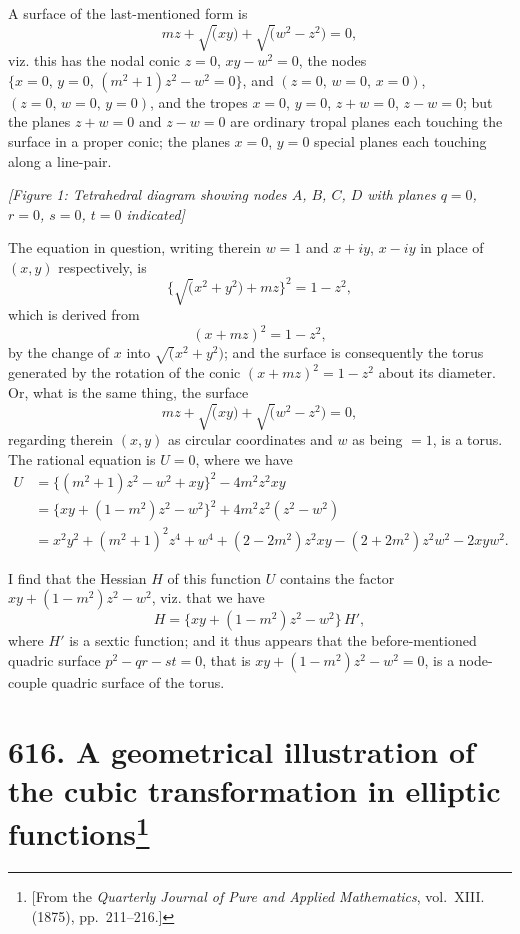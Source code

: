 \documentclass[11pt,a4paper]{book}
\begin{document}
A surface of the last-mentioned form is
\[
mz + \surd(xy) + \surd(w^2 - z^2) = 0,
\]
viz. this has the nodal conic $z = 0$, $xy - w^2 = 0$, the nodes $\{x = 0,\, y = 0,\, (m^2+1)z^2 - w^2 = 0\}$, and $(z = 0,\, w = 0,\, x = 0)$, $(z = 0,\, w = 0,\, y = 0)$, and the tropes $x = 0$, $y = 0$, $z+w = 0$, $z-w = 0$; but the planes $z+w = 0$ and $z-w = 0$ are ordinary tropal planes each touching the surface in a proper conic; the planes $x = 0$, $y = 0$ special planes each touching along a line-pair.

\begin{center}
\textit{[Figure 1: Tetrahedral diagram showing nodes $A$, $B$, $C$, $D$ with planes $q=0$, $r=0$, $s=0$, $t=0$ indicated]}
\end{center}

The equation in question, writing therein $w = 1$ and $x+iy$, $x-iy$ in place of $(x, y)$ respectively, is
\[
\{\surd(x^2+y^2) + mz\}^2 = 1 - z^2,
\]
which is derived from
\[
(x + mz)^2 = 1 - z^2,
\]
by the change of $x$ into $\surd(x^2+y^2)$; and the surface is consequently the torus generated by the rotation of the conic $(x+mz)^2 = 1-z^2$ about its diameter. Or, what is the same thing, the surface
\[
mz + \surd(xy) + \surd(w^2-z^2) = 0,
\]
regarding therein $(x, y)$ as circular coordinates and $w$ as being $= 1$, is a torus. The rational equation is $U = 0$, where we have
\begin{align*}
U &= \{(m^2+1)z^2 - w^2 + xy\}^2 - 4m^2z^2xy\\
&= \{xy + (1-m^2)z^2 - w^2\}^2 + 4m^2z^2(z^2-w^2)\\
&= x^2y^2 + (m^2+1)^2z^4 + w^4 + (2-2m^2)z^2xy - (2+2m^2)z^2w^2 - 2xyw^2.
\end{align*}

I find that the Hessian $H$ of this function $U$ contains the factor $xy + (1-m^2)z^2 - w^2$, viz. that we have
\[
H = \{xy + (1-m^2)z^2 - w^2\}\,H',
\]
where $H'$ is a sextic function; and it thus appears that the before-mentioned quadric surface $p^2 - qr - st = 0$, that is $xy + (1-m^2)z^2 - w^2 = 0$, is a node-couple quadric surface of the torus.

\newpage
\section[A geometrical illustration of the cubic transformation in elliptic functions]{\textbf{616.} A geometrical illustration of the cubic transformation in elliptic functions\footnote{[From the \textit{Quarterly Journal of Pure and Applied Mathematics}, vol.~XIII. (1875), pp.~211--216.]}}
\end{document}
